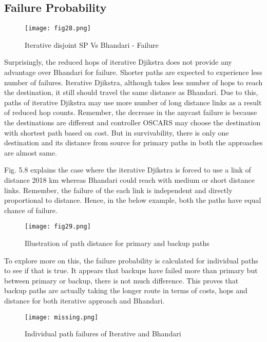 \subsection{ Failure Probability }

\begin{figure}[hbt!]
\centering
\texttt{[image: fig28.png]}
\caption{Iterative disjoint SP Vs Bhandari - Failure}
\label{fig:iterVsBhFailure}
\end{figure}

Surprisingly, the reduced hops of iterative Djikstra does not provide any advantage over Bhandari for failure. Shorter paths are expected to experience less number of failures. Iterative Djikstra, although takes less number of hops to reach the destination, it still should travel the same distance as Bhandari. Due to this, paths of iterative Djikstra may use more number of long distance links as a result of reduced hop counts. Remember, the decrease in the anycast failure is because the destinations are different and controller OSCARS may choose the destination with shortest path based on cost. But in survivability, there is only one destination and its distance from source for primary paths in both the approaches are almost same.

Fig. 5.8 explains the case where the iterative Djikstra is forced to use a link of distance 2018 km whereas Bhandari could reach with medium or short distance links. Remember, the failure of the each link is independent and directly proportional to distance. Hence, in the below example, both the paths have equal chance of failure. 

\begin{figure}[H]
\centering
\texttt{[image: fig29.png]}
\caption{Illustration of path distance for primary and backup paths}
\label{fig:ipathIllustration}
\end{figure}

To explore more on this, the failure probability is calculated for individual paths to see if that is true. It appears that backups have failed more than primary but between primary or backup, there is not much difference. This proves that backup paths are actually taking the longer route in terms of costs, hops and distance for both iterative approach and Bhandari.

\begin{figure}[H]
\centering
\texttt{[image: missing.png]}
\caption{Individual path failures of Iterative and Bhandari}
\label{fig:ipathIllustration}
\end{figure}

